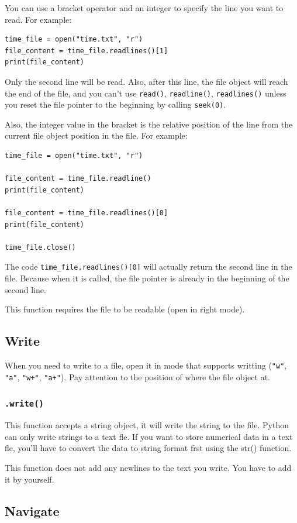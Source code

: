 \documentclass[12pt]{book}
\begin{document}
You can use a bracket operator and an integer to specify the line you want to read. For example:
\begin{verbatim}
time_file = open("time.txt", "r")
file_content = time_file.readlines()[1]
print(file_content)
\end{verbatim}
Only the second line will be read. Also, after this line, the file object will reach the end of the file, and you can't use \texttt{read()}, \texttt{readline()}, \texttt{readlines()} unless you reset the file pointer to the beginning by calling \texttt{seek(0)}.

Also, the integer value in the bracket is the relative position of the line from the current file object position in the file. For example:
\begin{verbatim}
time_file = open("time.txt", "r")

file_content = time_file.readline()
print(file_content)

file_content = time_file.readlines()[0]
print(file_content)

time_file.close()
\end{verbatim}
The code \texttt{time\_file.readlines()[0]} will actually return the second line in the file. Because when it is called, the file pointer is already in the beginning of the second line.

This function requires the file to be readable (open in right mode).
\subsection{Write}
\label{sec:org3f8c829}
When you need to write to a file, open it in mode that supports writting (\texttt{"w"}, \texttt{"a"}, \texttt{"w+"}, \texttt{"a+"}). Pay attention to the position of where the file object at.
\subsubsection{\texttt{.write()}}
\label{sec:org1d2e5cd}
This function accepts a string object, it will write the string to the file. Python can only write strings to a text fle. If you want to store numerical data in a text fle, you’ll have to convert the data to string format frst using the str() function.

This function does not add any newlines to the text you write. You have to add it by yourself.
\subsection{Navigate}
\label{sec:orgb71a6af}
\end{document}
